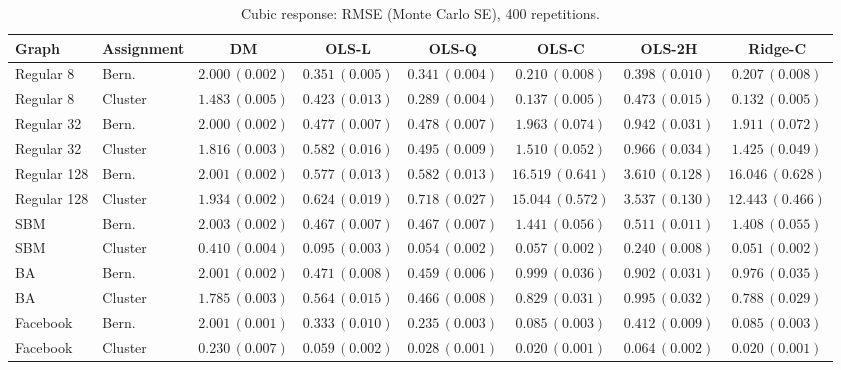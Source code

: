 \begin{table}[t]
\centering\scriptsize
\caption{Cubic response: RMSE (Monte Carlo SE), 400 repetitions.}
\begin{tabular}{llcccccc}
\toprule
Graph & Assignment & DM & OLS-L & OLS-Q & OLS-C & OLS-2H & Ridge-C \\
\midrule
Regular 8 & Bern. & $2.000\,(0.002)$ & $0.351\,(0.005)$ & $0.341\,(0.004)$ & $0.210\,(0.008)$ & $0.398\,(0.010)$ & $0.207\,(0.008)$ \\
Regular 8 & Cluster & $1.483\,(0.005)$ & $0.423\,(0.013)$ & $0.289\,(0.004)$ & $0.137\,(0.005)$ & $0.473\,(0.015)$ & $0.132\,(0.005)$ \\
Regular 32 & Bern. & $2.000\,(0.002)$ & $0.477\,(0.007)$ & $0.478\,(0.007)$ & $1.963\,(0.074)$ & $0.942\,(0.031)$ & $1.911\,(0.072)$ \\
Regular 32 & Cluster & $1.816\,(0.003)$ & $0.582\,(0.016)$ & $0.495\,(0.009)$ & $1.510\,(0.052)$ & $0.966\,(0.034)$ & $1.425\,(0.049)$ \\
Regular 128 & Bern. & $2.001\,(0.002)$ & $0.577\,(0.013)$ & $0.582\,(0.013)$ & $16.519\,(0.641)$ & $3.610\,(0.128)$ & $16.046\,(0.628)$ \\
Regular 128 & Cluster & $1.934\,(0.002)$ & $0.624\,(0.019)$ & $0.718\,(0.027)$ & $15.044\,(0.572)$ & $3.537\,(0.130)$ & $12.443\,(0.466)$ \\
SBM & Bern. & $2.003\,(0.002)$ & $0.467\,(0.007)$ & $0.467\,(0.007)$ & $1.441\,(0.056)$ & $0.511\,(0.011)$ & $1.408\,(0.055)$ \\
SBM & Cluster & $0.410\,(0.004)$ & $0.095\,(0.003)$ & $0.054\,(0.002)$ & $0.057\,(0.002)$ & $0.240\,(0.008)$ & $0.051\,(0.002)$ \\
BA & Bern. & $2.001\,(0.002)$ & $0.471\,(0.008)$ & $0.459\,(0.006)$ & $0.999\,(0.036)$ & $0.902\,(0.031)$ & $0.976\,(0.035)$ \\
BA & Cluster & $1.785\,(0.003)$ & $0.564\,(0.015)$ & $0.466\,(0.008)$ & $0.829\,(0.031)$ & $0.995\,(0.032)$ & $0.788\,(0.029)$ \\
Facebook & Bern. & $2.001\,(0.001)$ & $0.333\,(0.010)$ & $0.235\,(0.003)$ & $0.085\,(0.003)$ & $0.412\,(0.009)$ & $0.085\,(0.003)$ \\
Facebook & Cluster & $0.230\,(0.007)$ & $0.059\,(0.002)$ & $0.028\,(0.001)$ & $0.020\,(0.001)$ & $0.064\,(0.002)$ & $0.020\,(0.001)$ \\
\bottomrule
\end{tabular}
\end{table}

